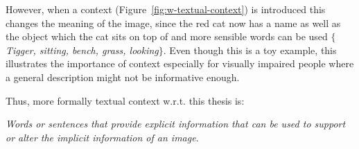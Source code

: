 However, when a context (Figure~\ref{fig:w-textual-context}) is introduced this changes the meaning of the image, since the red cat now has a name as well as the object which the cat sits on top of and more sensible words can be used \emph{$\{$Tigger, sitting, bench, grass, looking$\}$}. Even though this is a toy example, this illustrates the importance of context especially for visually impaired people where a general description might not be informative enough.

Thus, more formally textual context w.r.t. this thesis is:

\begin{displayquote}
	\emph{Words or sentences that provide explicit information that can be used to support or alter the implicit information of an image}.
\end{displayquote}

